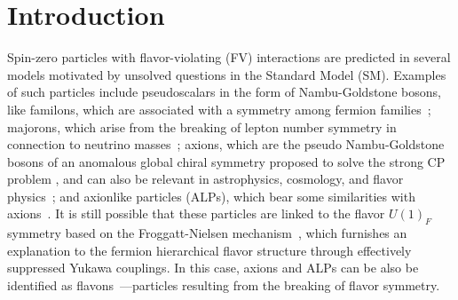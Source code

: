 \documentclass[prd,amsfonts,onecolumn,superscriptaddress,aps,nofootinbib,11pt]{revtex4-1}
\begin{document}
\maketitle
	
\section{Introduction}

\setcounter{page}{1}

Spin-zero particles with flavor-violating (FV) interactions are predicted in several models motivated by unsolved questions in the Standard Model (SM). Examples of such particles include pseudoscalars in the form of Nambu-Goldstone bosons, like familons, which are associated with a symmetry among fermion families~\cite{Davidson:1981zd,Wilczek:1982rv,Reiss:1982sq,Gelmini:1982zz,Davidson:1983fy,Feng:1997tn}; majorons, which arise from the breaking of lepton number symmetry in connection to neutrino masses~\cite{Mohapatra:1979ia,Chikashige:1980qk,Chikashige:1980ui,Gelmini:1980re}; axions, which are the pseudo Nambu-Goldstone bosons of an anomalous global chiral symmetry proposed to solve the strong CP problem \cite{Peccei:1977hh,Weinberg:1977ma,Wilczek:1977pj,Georgi:1986df}, and can also be relevant in astrophysics, cosmology, and flavor physics~\cite{DiLuzio:2020wdo,Ema:2016ops,Bjorkeroth:2018dzu}; and axionlike particles (ALPs), which bear some similarities with axions~\cite{Jaeckel:2010ni,Ringwald:2012cu,Dias:2014osa,Bauer:2021mvw,Jho:2022snj}. It is still possible that these particles are linked to the flavor $U(1)_F$ symmetry based on the Froggatt-Nielsen mechanism~\cite{Froggatt:1978nt}, which furnishes an explanation to the fermion hierarchical flavor structure through effectively suppressed Yukawa couplings. In this case, axions and ALPs can be also be identified as flavons~\cite{Ema:2016ops,Bjorkeroth:2018dzu}---particles resulting from the breaking of flavor symmetry. 
\end{document}
